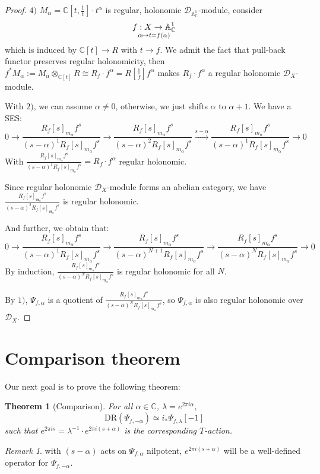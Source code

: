 \documentclass[openany]{book}
\newtheorem{theorem}{Theorem}[chapter] %
\theoremstyle{definition} %
\theoremstyle{remark}
\newtheorem{remark}{Remark}[chapter] %
\begin{document}
\begin{proof}
    $4)$ $M_{\alpha} = \mathbb{C}[t, \frac{1}{t}] \cdot t^{\alpha}$ is regular, holonomic $\mathcal{D}_{\mathbb{A}^{1}_{\mathbb{C}}}$-module, consider $$f:X\rightarrow \mathbb{A}^{1}_{\mathbb{C}}\atop \alpha\mapsto t=f(\alpha)$$which is induced by $\mathbb{C}[t]\rightarrow R$ with $t\rightarrow f$.
    We admit the fact that pull-back functor preserves regular holonomicity, then $f^{*} M_{\alpha}:=M_{\alpha}\otimes_{\mathbb{C}[t]} R\cong R_{f}\cdot f^\alpha= R[\frac{1}{f}] f^{\alpha}$ makes $R_{f}\cdot f^\alpha$ a regular holonomic $\mathcal{D}_{X}$-module.

    With $2)$, we can assume $\alpha\neq 0$, otherwise, we just shifts $\alpha$ to $\alpha+1$.
    We have a SES:$$0 \to \frac{R_f[s]_{m_{\alpha}} f^{s}}{(s-\alpha)^1 R_f[s]_{m_{\alpha}} f^{s}}  \to \frac{R_f[s]_{m_{\alpha}} f^{s}}{(s-\alpha)^2 R_f[s]_{m_{\alpha}} f^{s}} \xrightarrow{s-\alpha} \frac{R_f[s]_{m_{\alpha}} f^{s}}{(s-\alpha)^1 R_f[s]_{m_{\alpha}} f^{s}}  \to 0$$With $\frac{R_f[s]_{m_{\alpha}} f^{s}}{(s-\alpha)^1 R_f[s]_{m_{\alpha}} f^{s}}=R_{f} \cdot f^{\alpha}$ regular holonomic.

    Since regular holonomic $\mathcal{D}_{X}$-module forms an abelian category,  we have $\frac{R_{f}[s]_{\mathfrak{m}_{\alpha}}f^{s}}{(s-\alpha)^{2}R_{f}[s]_{\mathfrak{m}_{\alpha}}f^{s}}$ is regular holonomic.

    And further, we obtain that: $$0 \to \frac{R_f[s]_{m_{\alpha}} f^{s}}{(s-\alpha)^1 R_f[s]_{m_{\alpha}} f^{s}}  \to \frac{R_f[s]_{m_{\alpha}} f^{s}}{(s-\alpha)^{N+1} R_f[s]_{m_{\alpha}} f^{s}} \to \frac{R_f[s]_{m_{\alpha}} f^{s}}{(s-\alpha)^N R_f[s]_{m_{\alpha}} f^{s}}  \to 0$$By induction, $\frac{R_f[s]_{m_{\alpha}} f^{s}}{(s-\alpha)^{N} R_f[s]_{m_{\alpha}} f^{s}}$ is regular holonomic for all $N$.

    By $1)$, $\Psi_{f,\alpha}$ is a quotient of $\frac{R_f[s]_{m_{\alpha}} f^{s}}{(s-\alpha)^N R_f[s]_{m_{\alpha}} f^{s}}$, so $\Psi_{f,\alpha}$ is also regular holonomic over $\mathcal{D}_{X}$.
\end{proof}
\section{Comparison theorem}
Our next goal is to prove the following theorem:
\begin{theorem}[Comparison] \label{Theorem 9.5}
    For all $\alpha \in \mathbb{C}$, $\lambda = e^{2\pi i\alpha}$, $$\mathrm{DR}(\Psi_{f,-\alpha}) \simeq i_* \Psi_{f,\lambda}[-1]$$such that $e^{2\pi is} = \lambda^{-1}\cdot e^{2\pi i(s+\alpha)}$ is the corresponding $T$-action.
\end{theorem}
\begin{remark}
    with $(s-\alpha)$ acts on $\Psi_{f,\alpha}$ nilpotent, $e^{2\pi i(s+\alpha)}$ will be a well-defined operator for $\Psi_{f,-\alpha}$.
\end{remark}
\end{document}
